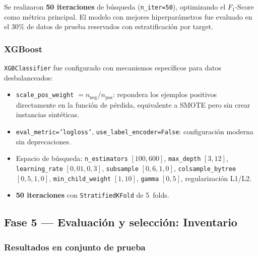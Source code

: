 \documentclass[12pt, a4paper]{article}
\begin{document}
Se realizaron \textbf{50 iteraciones} de b\'usqueda (\texttt{n\_iter=50}), optimizando el $F_1$-Score como m\'etrica principal. El modelo con mejores hiperpar\'ametros fue evaluado en el 30\% de datos de prueba reservados con estratificaci\'on por target.

\subsubsection{XGBoost}

\texttt{XGBClassifier} fue configurado con mecanismos espec\'ificos para datos desbalanceados:

\begin{itemize}[leftmargin=1.5em, itemsep=2pt]
  \item \texttt{scale\_pos\_weight} $= n_{\text{neg}} / n_{\text{pos}}$: repondera los ejemplos positivos directamente en la funci\'on de p\'erdida, equivalente a SMOTE pero sin crear instancias sint\'eticas.
  \item \texttt{eval\_metric='logloss'}, \texttt{use\_label\_encoder=False}: configuraci\'on moderna sin deprecaciones.
  \item Espacio de b\'usqueda: \texttt{n\_estimators} $[100,600]$, \texttt{max\_depth} $[3,12]$, \texttt{learning\_rate} $[0{,}01, 0{,}3]$, \texttt{subsample} $[0{,}6, 1{,}0]$, \texttt{colsample\_bytree} $[0{,}5, 1{,}0]$, \texttt{min\_child\_weight} $[1,10]$, \texttt{gamma} $[0,5]$, regularizaci\'on L1/L2.
  \item \textbf{50 iteraciones} con \texttt{StratifiedKFold} de 5~folds.
\end{itemize}

\subsection{Fase 5 --- Evaluaci\'on y selecci\'on: Inventario}

\subsubsection{Resultados en conjunto de prueba}
\end{document}
